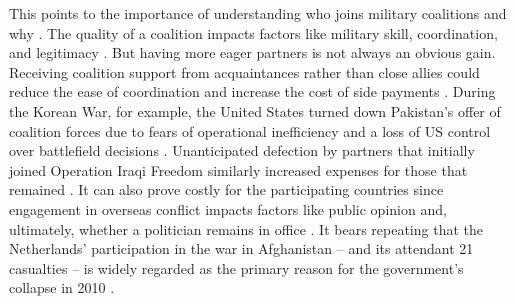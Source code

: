\documentclass[12pt,letterpaper]{article}
\begin{document}
	This points to the importance of understanding who joins military coalitions and why \citep{wolford_politicsmilitarycoalitions_2015, moller_fightingfriendsinstitutional_2016}. The quality of a coalition impacts factors like military skill, coordination, and legitimacy \citep{kreps_coalitionsconvenienceunited_2011, auerswald_natoafghanistanfighting_2014, saideman_ambivalentcoalitiondoing_2016, cranmer_coalitionqualitymultinational_2017, cappellazielinski_organizingperformancecoalition_2020}. But having more eager partners is not always an obvious gain. Receiving coalition support from acquaintances rather than close allies could reduce the ease of coordination and increase the cost of side payments \citep{morrow_alliancesasymmetryalternative_1991, papayoanou_intraalliancebargainingbosnia_1997, wolford_politicsmilitarycoalitions_2015, henke_buyingalliespayment_2019}. During the Korean War, for example, the United States turned down Pakistan's offer of coalition forces due to fears of operational inefficiency and a loss of US control over battlefield decisions \citep{stueck_koreanwarinternational_1997}. Unanticipated defection by partners that initially joined Operation Iraqi Freedom similarly increased expenses for those that remained \citep[12-13]{mcinnis_varietiesdefectionstrategies_2018}. It can also prove costly for the participating countries since engagement in overseas conflict impacts factors like public opinion and, ultimately, whether a politician remains in office \citep{chiozza_leadersinternationalconflict_2011, wolford_nationalleaderspolitical_2016, mello_pathscoalitiondefection_2020}. It bears repeating that the Netherlands' participation in the war in Afghanistan -- and its attendant 21 casualties -- is widely regarded as the primary reason for the government's collapse in 2010 \citep[152-156]{auerswald_natoafghanistanfighting_2014}.
\end{document}
